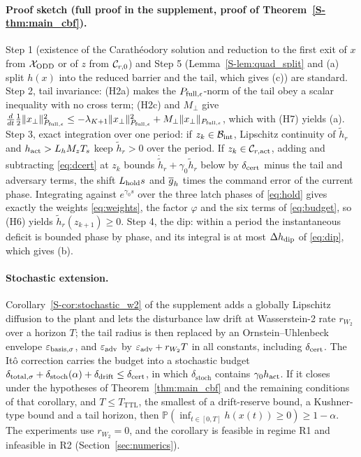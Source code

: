 \paragraph{Proof sketch (full proof in the supplement, proof of Theorem~\ref{S-thm:main_cbf}).}
Step 1 (existence of the Carath\'eodory solution and reduction to the first exit of $x$ from $\mathcal{X}_{\mathrm{ODD}}$ or of $z$ from $\mathcal{C}_{r,0}$) and Step 5 (Lemma~\ref{S-lem:quad_split} and (a) split $h(x)$ into the reduced barrier and the tail, which gives (c)) are standard. Step 2, tail invariance: (H2a) makes the $P_{\mathrm{full},\epsilon}$-norm of the tail obey a scalar inequality with no cross term; (H2c) and $M_\perp$ give $\frac{d}{dt}\tfrac12\|x_\perp\|_{P_{\mathrm{full},\epsilon}}^2 \le -\lambda_{K+1}\|x_\perp\|_{P_{\mathrm{full},\epsilon}}^2 + M_\perp\|x_\perp\|_{P_{\mathrm{full},\epsilon}}$, which with (H7) yields (a). Step 3, exact integration over one period: if $z_k \in \mathcal{B}_{\mathrm{int}}$, Lipschitz continuity of $\tilde h_r$ and $h_{\mathrm{act}} > L_hM_zT_s$ keep $\tilde h_r > 0$ over the period. If $z_k \in \mathcal{C}_{r,\mathrm{act}}$, adding and subtracting \eqref{eq:dcert} at $z_k$ bounds $\dot{\tilde h}_r + \gamma_0\tilde h_r$ below by $\delta_{\mathrm{cert}}$ minus the tail and adversary terms, the shift $L_{\mathrm{hold}} s$ and $\overline{g}_h$ times the command error of the current phase. Integrating against $e^{\gamma_0 s}$ over the three latch phases of \eqref{eq:hold} gives exactly the weights \eqref{eq:weights}, the factor $\varphi$ and the six terms of \eqref{eq:budget}, so (H6) yields $\tilde h_r(z_{k+1}) \ge 0$. Step 4, the dip: within a period the instantaneous deficit is bounded phase by phase, and its integral is at most $\Delta h_{\mathrm{dip}}$ of \eqref{eq:dip}, which gives (b).

\paragraph{Stochastic extension.}
Corollary~\ref{S-cor:stochastic_w2} of the supplement adds a globally Lipschitz diffusion to the plant and lets the disturbance law drift at Wasserstein-2 rate $r_{W_2}$ over a horizon $T$; the tail radius is then replaced by an Ornstein--Uhlenbeck envelope $\varepsilon_{\mathrm{basis},\sigma}$, and $\varepsilon_{\mathrm{adv}}$ by $\varepsilon_{\mathrm{adv}} + r_{W_2}T$ in all constants, including $\delta_{\mathrm{cert}}$. The It\^o correction carries the budget into a stochastic budget $\delta_{\mathrm{total},\sigma} + \delta_{\mathrm{stoch}}(\alpha) + \delta_{\mathrm{drift}} \le \delta_{\mathrm{cert}}$, in which $\delta_{\mathrm{stoch}}$ contains $\gamma_0h_{\mathrm{act}}$. If it closes under the hypotheses of Theorem~\ref{thm:main_cbf} and the remaining conditions of that corollary, and $T \le T_{\mathrm{TTL}}$, the smallest of a drift-reserve bound, a Kushner-type bound \citep{kushner1967stochastic} and a tail horizon, then $\mathbb{P}(\inf_{t\in[0,T]}h(x(t)) \ge 0) \ge 1 - \alpha$. The experiments use $r_{W_2} = 0$, and the corollary is feasible in regime R1 and infeasible in R2 (Section~\ref{sec:numerics}).

